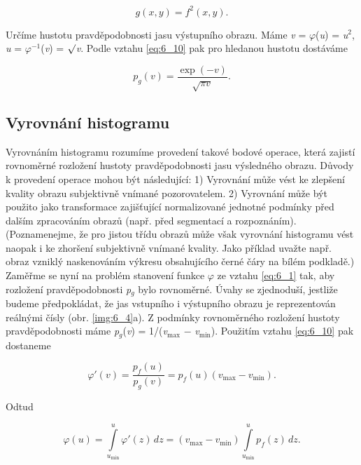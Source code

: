 \begin{equation}
    g(x, y) = f^2(x, y). \nonumber
\end{equation}

Určíme hustotu pravděpodobnosti jasu výstupního obrazu. Máme \textit{v} = $\varphi$(\textit{u}) = \textit{u}$^2$, \textit{u} = $\varphi^{-1}$(\textit{v}) = $\surd$\textit{v}. Podle vztahu \eqref{eq:6_10} pak pro hledanou hustotu dostáváme

\begin{equation}
    p_g(v) = \frac{\exp(-v)}{\sqrt{\pi v}}. \nonumber
\end{equation}

\subsection*{Vyrovnání histogramu}

Vyrovnáním histogramu rozumíme provedení takové bodové operace, která zajistí rovnoměrné rozložení hustoty pravděpodobnosti jasu výsledného obrazu. Důvody k provedení operace mohou být následující: 1) Vyrovnání může vést ke zlepšení kvality obrazu subjektivně vnímané pozorovatelem. 2) Vyrovnání může být použito jako transformace zajišťující normalizované jednotné podmínky před dalším zpracováním obrazů (např. před segmentací a rozpoznáním). (Poznamenejme, že pro jistou třídu obrazů může však vyrovnání histogramu vést naopak i ke zhoršení subjektivně vnímané kvality. Jako příklad uvažte např. obraz vzniklý naskenováním výkresu obsahujícího černé čáry na bílém podkladě.) Zaměřme se nyní na problém stanovení funkce $\varphi$ ze vztahu \eqref{eq:6_1} tak, aby rozložení pravděpodobnosti \textit{p}$_g$ bylo rovnoměrné. Úvahy se zjednoduší, jestliže budeme předpokládat, že jas vstupního i výstupního obrazu je reprezentován reálnými čísly (obr. \ref{img:6_4}a). Z podmínky rovnoměrného rozložení hustoty pravděpodobnosti máme \textit{p}$_g$(\textit{v}) = 1/(\textit{v}$_{\max}$ $-$ \textit{v}$_{\min}$). Použitím vztahu \eqref{eq:6_10} pak dostaneme

\begin{equation} \label{eq:6_11}
    \varphi'(v) = \frac{p_f(u)}{p_g(v)} = p_f(u)(v_{\max} - v_{\min}).
\end{equation}

Odtud

\begin{equation} \label{eq:6_12}
    \varphi(u) = \int\limits_{u_{\min}}^{u} \varphi'(z)\,dz = (v_{\max} - v_{\min}) \int\limits_{u_{\min}}^{u} p_f(z)\,dz.
\end{equation}

